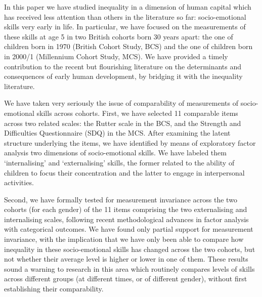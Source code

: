 In this paper we have studied inequality in a dimension of human capital which has received less attention than others in the literature so far: socio-emotional skills very early in life. In particular, we have focused on the measurements of these skills at age 5 in two British cohorts born 30 years apart: the one of children born in 1970 (British Cohort Study, BCS) and the one of children born in 2000/1 (Millennium Cohort Study, MCS). We have provided a timely contribution to the recent but flourishing literature on the determinants and consequences of early human development, by bridging it with the inequality literature.

We have taken very seriously the issue of comparability of measurements of socio-emotional skills across cohorts. First, we have selected 11 comparable items across two related scales: the Rutter scale in the BCS, and the Strength and Difficulties Questionnaire (SDQ) in the MCS. After examining the latent structure underlying the items, we have identified by means of exploratory factor analysis two dimensions of socio-emotional skills. We have labeled them `internalising' and `externalising' skills, the former related to the ability of children to focus their concentration and the latter to engage in interpersonal activities.

Second, we have formally tested for measurement invariance across the two cohorts (for each gender) of the 11 items comprising the two externalising and internalising scales, following recent methodological advances in factor analysis with categorical outcomes. We have found only partial support for measurement invariance, with the implication that we have only been able to compare how inequality in these socio-emotional skills has changed across the two cohorts, but not whether their average level is higher or lower in one of them. These results sound a warning to research in this area which routinely compares levels of skills across different groups (at different times, or of different gender), without first establishing their comparability.

